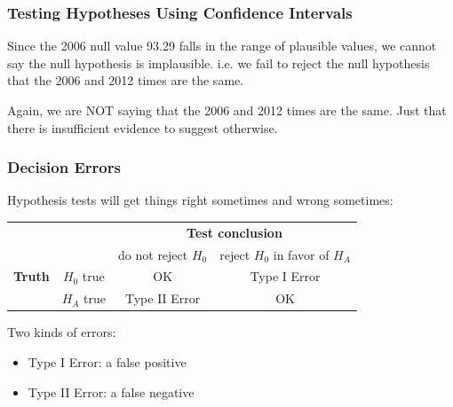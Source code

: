 \documentclass[handout]{beamer}
\newcommand{\blue}[1]{\textcolor{blue2}{#1}}
\begin{document}
\begin{frame}
\frametitle{Testing Hypotheses Using Confidence Intervals}

Since the 2006 \blue{null value} 93.29 falls in the range of plausible values, we cannot say the null hypothesis is implausible.  i.e. we fail to reject the null hypothesis that the 2006 and 2012 times are the same.  

\pause \vspace{0.25cm}

Again, we are NOT saying that the 2006 and 2012 times are the same.  Just that there is insufficient evidence to suggest otherwise.


\end{frame}



\begin{frame}
\frametitle{Decision Errors}
Hypothesis tests will get things right sometimes and wrong sometimes:
\pause \begin{center}
  \begin{tabular}{cc|cc}
     \multicolumn{2}{c}{}  & \multicolumn{2}{c}{\textbf{Test conclusion}} \\ 
     &  & do not reject $H_0$ & reject $H_0$ in favor of $H_A$ \\ 
\hline
    \textbf{Truth} & $H_0$ true & OK & \blue{Type I Error} \\ 
     & $H_A$ true & \blue{Type II Error} & OK \\ 
    \hline
  \end{tabular}
\end{center}

\vspace{0.25cm}

\pause Two kinds of errors:
\begin{itemize}
\pause \item \blue{Type I Error}: a false positive
\pause \item \blue{Type II Error}: a false negative
\end{itemize}

\end{frame}
\end{document}
